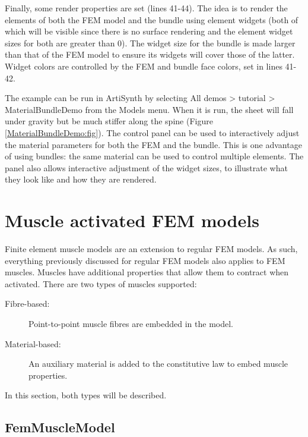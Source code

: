 Finally, some render properties are set (lines 41-44). The idea is to
render the elements of both the FEM model and the bundle using element
widgets (both of which will be visible since there is no surface
rendering and the element widget sizes for both are greater than 0).
The widget size for the bundle is made larger than that of the FEM
model to ensure its widgets will cover those of the latter. Widget
colors are controlled by the FEM and bundle face colors, set in lines
41-42.

The example can be run in ArtiSynth by selecting {\sf All demos >
tutorial > MaterialBundleDemo} from the {\sf Models} menu.  When it is
run, the sheet will fall under gravity but be much stiffer along the
spine (Figure \ref{MaterialBundleDemo:fig}). The control panel can be
used to interactively adjust the material parameters for both the FEM
and the bundle. This is one advantage of using bundles: the same
material can be used to control multiple elements. The panel also
allows interactive adjustment of the widget sizes, to illustrate what
they look like and how they are rendered.

\section{Muscle activated FEM models}
\label{sec:fem:muscle}

Finite element muscle models are an extension to regular FEM models.  As such,
everything previously discussed for regular FEM models also applies to FEM
muscles.  Muscles have additional properties that allow them to contract when 
activated.  There are two types of muscles supported:
\begin{description}
\item[Fibre-based:] Point-to-point muscle fibres are embedded in the model.
\item[Material-based:] An auxiliary material is added to the constitutive law
    to embed muscle properties. 
\end{description}
In this section, both types will be described.

\subsection{FemMuscleModel}

